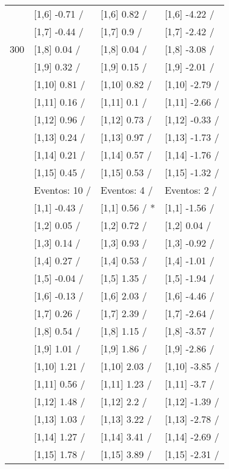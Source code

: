 \begin{table}
\begin{tabular}[t]{llll}
 & {}[1,6] -0.71  / & {}[1,6] 0.82  / & {}[1,6] -4.22  /\\
 & {}[1,7] -0.44  / & {}[1,7] 0.9  / & {}[1,7] -2.42  /\\
300 & {}[1,8] 0.04  / & {}[1,8] 0.04  / & {}[1,8] -3.08  /\\
\addlinespace
 & {}[1,9] 0.32  / & {}[1,9] 0.15  / & {}[1,9] -2.01  /\\
 & {}[1,10] 0.81  / & {}[1,10] 0.82  / & {}[1,10] -2.79  /\\
 & {}[1,11] 0.16  / & {}[1,11] 0.1  / & {}[1,11] -2.66  /\\
 & {}[1,12] 0.96  / & {}[1,12] 0.73  / & {}[1,12] -0.33  /\\
 & {}[1,13] 0.24  / & {}[1,13] 0.97  / & {}[1,13] -1.73  /\\
\addlinespace
 & {}[1,14] 0.21  / & {}[1,14] 0.57  / & {}[1,14] -1.76  /\\
 & {}[1,15] 0.45  / & {}[1,15] 0.53  / & {}[1,15] -1.32  /\\
 & Eventos:  10 / & Eventos:  4 / & Eventos:  2 /\\
 & {}[1,1] -0.43  / & {}[1,1] 0.56  / * & {}[1,1] -1.56  /\\
 & {}[1,2] 0.05  / & {}[1,2] 0.72  / & {}[1,2] 0.04  /\\
\addlinespace
 & {}[1,3] 0.14  / & {}[1,3] 0.93  / & {}[1,3] -0.92  /\\
 & {}[1,4] 0.27  / & {}[1,4] 0.53  / & {}[1,4] -1.01  /\\
 & {}[1,5] -0.04  / & {}[1,5] 1.35  / & {}[1,5] -1.94  /\\
 & {}[1,6] -0.13  / & {}[1,6] 2.03  / & {}[1,6] -4.46  /\\
 & {}[1,7] 0.26  / & {}[1,7] 2.39  / & {}[1,7] -2.64  /\\
\addlinespace
500 & {}[1,8] 0.54  / & {}[1,8] 1.15  / & {}[1,8] -3.57  /\\
 & {}[1,9] 1.01  / & {}[1,9] 1.86  / & {}[1,9] -2.86  /\\
 & {}[1,10] 1.21  / & {}[1,10] 2.03  / & {}[1,10] -3.85  /\\
 & {}[1,11] 0.56  / & {}[1,11] 1.23  / & {}[1,11] -3.7  /\\
 & {}[1,12] 1.48  / & {}[1,12] 2.2  / & {}[1,12] -1.39  /\\
\addlinespace
 & {}[1,13] 1.03  / & {}[1,13] 3.22  / & {}[1,13] -2.78  /\\
 & {}[1,14] 1.27  / & {}[1,14] 3.41  / & {}[1,14] -2.69  /\\
 & {}[1,15] 1.78  / & {}[1,15] 3.89  / & {}[1,15] -2.31  /\\
\bottomrule
\end{tabular}
\end{table}
